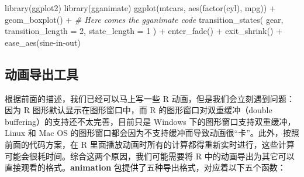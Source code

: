\documentclass[
  b5paper,
  UTF8,twoside]{book}
\newenvironment{Shaded}{\begin{snugshade}}{\end{snugshade}}
\newcommand{\AttributeTok}[1]{\textcolor[rgb]{0.77,0.63,0.00}{#1}}
\newcommand{\CommentTok}[1]{\textcolor[rgb]{0.56,0.35,0.01}{\textit{#1}}}
\newcommand{\DecValTok}[1]{\textcolor[rgb]{0.00,0.00,0.81}{#1}}
\newcommand{\FunctionTok}[1]{\textcolor[rgb]{0.00,0.00,0.00}{#1}}
\newcommand{\NormalTok}[1]{#1}
\newcommand{\SpecialCharTok}[1]{\textcolor[rgb]{0.00,0.00,0.00}{#1}}
\newcommand{\StringTok}[1]{\textcolor[rgb]{0.31,0.60,0.02}{#1}}
\begin{document}
\begin{Shaded}
\begin{Highlighting}[]
\FunctionTok{library}\NormalTok{(ggplot2)}
\FunctionTok{library}\NormalTok{(gganimate)}
\FunctionTok{ggplot}\NormalTok{(mtcars, }\FunctionTok{aes}\NormalTok{(}\FunctionTok{factor}\NormalTok{(cyl), mpg)) }\SpecialCharTok{+} 
  \FunctionTok{geom\_boxplot}\NormalTok{() }\SpecialCharTok{+} 
  \CommentTok{\# Here comes the gganimate code}
  \FunctionTok{transition\_states}\NormalTok{(}
\NormalTok{    gear,}
    \AttributeTok{transition\_length =} \DecValTok{2}\NormalTok{,}
    \AttributeTok{state\_length =} \DecValTok{1}
\NormalTok{  ) }\SpecialCharTok{+}
  \FunctionTok{enter\_fade}\NormalTok{() }\SpecialCharTok{+} 
  \FunctionTok{exit\_shrink}\NormalTok{() }\SpecialCharTok{+}
  \FunctionTok{ease\_aes}\NormalTok{(}\StringTok{\textquotesingle{}sine{-}in{-}out\textquotesingle{}}\NormalTok{)}
\end{Highlighting}
\end{Shaded}

\hypertarget{ux52a8ux753bux5bfcux51faux5de5ux5177}{%
\subsection{动画导出工具}\label{ux52a8ux753bux5bfcux51faux5de5ux5177}}

根据前面的描述，我们已经可以马上写一些 R 动画，但是我们会立刻遇到问题：因为 R 图形默认显示在图形窗口中，而 R 的图形窗口对双重缓冲（double buffering）的支持还不太完善，目前只是 Windows 下的图形窗口支持双重缓冲，Linux 和 Mac OS 的图形窗口都会因为不支持缓冲而导致动画很``卡''。此外，按照前面的代码方案，在 R 里面播放动画时所有的计算都得重新实时进行，这些计算可能会很耗时间。综合这两个原因，我们可能需要将 R 中的动画导出为其它可以直接观看的格式。\textbf{animation} 包提供了五种导出格式，对应着以下五个函数：
\end{document}
